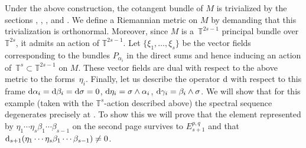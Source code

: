 \documentclass[pdftex]{sigma}
\numberwithin{equation}{section}
\theoremstyle{definition}
\begin{document}
Under the above construction, the cotangent bundle of $M$ is trivialized by the sections , , \smash{$\sigma:=\pi^*\overline{\sigma}$},  and . We define a Riemannian metric on $M$ by demanding that this trivialization is orthonormal. Moreover, since $M$ is a~$\mathbb{T}^{2s-1}$ principal bundle over $\mathbb{T}^{2s}$, it admits an action of $\mathbb{T}^{2s-1}$. Let $\{\xi_1,\dots,\xi_s\}$ be the vector fields corresponding to the bundles $P_{\alpha_i}$ in the direct sums and hence inducing an action of~${\mathbb{T}^s\subset\mathbb{T}^{2s-1}}$ on $M$. These vector fields are dual with respect to the above metric to the forms~$\eta_i$. Finally, let us describe the operator ${\rm d}$ with respect to this frame
${\rm d}\alpha_i={\rm d}\beta_i={\rm d}\sigma=0$, ${\rm d}\eta_i=\sigma\wedge\alpha_i$, ${\rm d}\gamma_i=\beta_i\wedge\sigma$.
We will show that for this example (taken with the $\mathbb{T}^s$-action described above) the spectral sequence degenerates precisely at . To show this we will prove that the element represented by $\eta_1\cdots \eta_s\beta_1\cdots \beta_{s-1}$ on the second page survives to $E^{p,q}_{s+1}$ and that ${\rm d}_{s+1}(\eta_1\cdots \eta_s\beta_1\cdots \beta_{s-1})\neq 0$.
\end{document}
